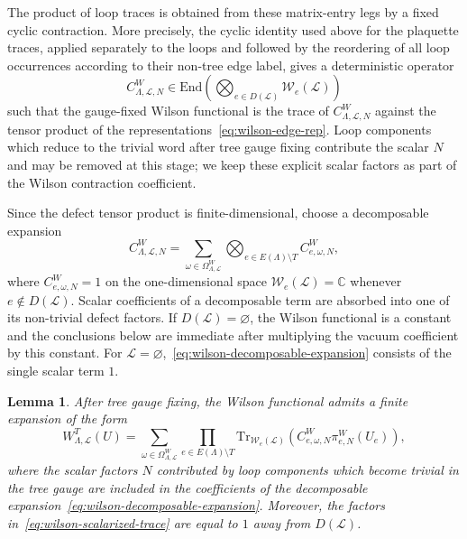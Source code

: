 \documentclass[11pt,a4paper,reqno]{article}
\newtheorem{lemma}[theorem]{Lemma}
\theoremstyle{definition}
\theoremstyle{remark}
\newcommand\C{\mathbb{C}}
\newcommand\Tr{\mathrm{Tr}}
\newcommand\End{{\mathrm{End}}}
\newcommand\Lc{{\mathcal{L}}}
\begin{document}
The product of loop traces is obtained from these matrix-entry legs by a fixed cyclic contraction. More precisely, the cyclic identity used above for the plaquette traces, applied separately to the loops and followed by the reordering of all loop occurrences according to their non-tree edge label, gives a deterministic operator
\[
C^W_{\Lambda,\Lc,N}
\in
\End\!\left(\bigotimes_{e\in D(\Lc)}\mathcal W_e(\Lc)\right)
\]
such that the gauge-fixed Wilson functional is the trace of $C^W_{\Lambda,\Lc,N}$ against the tensor product of the representations~\eqref{eq:wilson-edge-rep}. Loop components which reduce to the trivial word after tree gauge fixing contribute the scalar $N$ and may be removed at this stage; we keep these explicit scalar factors as part of the Wilson contraction coefficient.

Since the defect tensor product is finite-dimensional, choose a decomposable expansion
\begin{equation}\label{eq:wilson-decomposable-expansion}
C^W_{\Lambda,\Lc,N}
=\sum_{\omega\in\Omega^W_{\Lambda,\Lc}}
\bigotimes_{e\in E(\Lambda)\setminus T}C^W_{e,\omega,N},
\end{equation}
where $C^W_{e,\omega,N}=1$ on the one-dimensional space $\mathcal W_e(\Lc)=\C$ whenever $e\notin D(\Lc)$. Scalar coefficients of a decomposable term are absorbed into one of its non-trivial defect factors. If $D(\Lc)=\varnothing$, the Wilson functional is a constant and the conclusions below are immediate after multiplying the vacuum coefficient by this constant. For $\Lc=\varnothing$,~\eqref{eq:wilson-decomposable-expansion} consists of the single scalar term $1$.

\begin{lemma}\label{lem:wilson-scalarization}
After tree gauge fixing, the Wilson functional admits a finite expansion of the form
\begin{equation}\label{eq:wilson-scalarized-trace}
W^T_{\Lambda,\Lc}(U)
=\sum_{\omega\in\Omega^W_{\Lambda,\Lc}}
\prod_{e\in E(\Lambda)\setminus T}
\Tr_{\mathcal W_e(\Lc)}\!\left(
C^W_{e,\omega,N}\pi^W_{e,N}(U_e)
\right),
\end{equation}
where the scalar factors $N$ contributed by loop components which become trivial in the tree gauge are included in the coefficients of the decomposable expansion~\eqref{eq:wilson-decomposable-expansion}. Moreover, the factors in~\eqref{eq:wilson-scalarized-trace} are equal to $1$ away from $D(\Lc)$.
\end{lemma}
\end{document}
